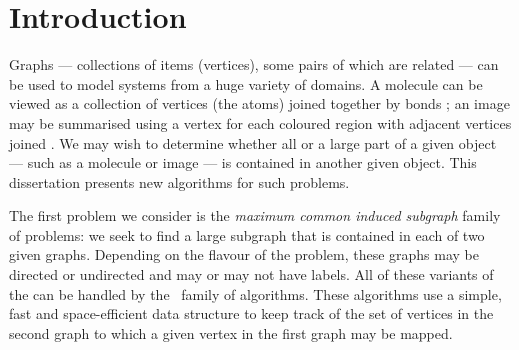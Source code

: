 \chapter{Introduction}
\label{c:intro}

\newcommand{\FourQueens}[2] {
  \begin{tikzpicture}[scale=0.6, every node/.style={black,scale=0.9}]
    \newcommand*{\xMin}{0}%
    \newcommand*{\xMax}{3}%
    \newcommand*{\yMin}{0}%
    \newcommand*{\yMax}{3}%
    \foreach \i / \label in {0/a,1/b,2/c,3/d} {
        \draw [] node at (\i+.5,\yMin-.3) {$\label$};
    }
    \foreach \i / \label in {0/1,1/2,2/3,3/4} {
        \draw [] node at (\xMin-.3,\i+.5) {$\label$};
    }

    \foreach \y in {0,2}{
        \foreach \x in {0,2}{
            \fill[black!8] (\x,\y) rectangle (1+\x,1+\y) rectangle (2+\x,2+\y);}}
    \draw [step=1.0] (0,0) grid (4,4);
    \foreach \x/\y/\m in {#2}
        \draw [] node at (\x,\y) {\m};
    \node[draw,circle,inner sep=1mm] at (-1.4,3.5) {#1};
  \end{tikzpicture}
}

\newcommand{\MCSDomains}[2] {
  \begin{tikzpicture}[scale=0.6, every node/.style={black,scale=0.9}]
    \newcommand*{\xMin}{0}%
    \newcommand*{\xMax}{5}%
    \newcommand*{\yMin}{0}%
    \newcommand*{\yMax}{4}%
    \foreach \i / \label in {0/a,1/b,2/c,3/d,4/e,5/f} {
        \draw [] node at (\i+.5,\yMax+1.4) {$\label$};
    }
    \foreach \i / \label in {4/1,3/2,2/3,1/4,0/5} {
        \draw [] node at (\xMin-.3,\i+.5) {$\label$};
    }

    \draw [step=1.0] (0,0) grid (6,5);
    \foreach \x/\y/\m in {#2}
        \draw [] node at (\x,\y) {\m};
    \node[draw,circle,inner sep=1mm] at (-1.4,3.5) {#1};
  \end{tikzpicture}
}

Graphs --- collections of items (vertices), some pairs of which
are related --- can be used to model
systems from a huge variety of domains.  A molecule can be viewed as a collection
of vertices (the atoms) joined together by bonds
\citep{sussenguth1965graph}; 
an image may be summarised using a vertex for each coloured region
with adjacent vertices joined \citep{DBLP:conf/icip/OlatunbosunDE96}.
We may wish to determine whether all or a large
part of a given object --- such as a molecule or image --- is contained
in another given object.  This dissertation presents new algorithms
for such problems.

The first problem we consider is the \emph{maximum common induced subgraph}
family of problems: we seek to find a large subgraph that is
contained in each of two given graphs.
Depending on the flavour of the problem, these
graphs may be directed or undirected and may or may not have labels.
All of these variants of the can be handled by the \McSplit\ family of algorithms.
These algorithms use a simple, fast and space-efficient data structure to keep
track of the set of vertices in the second graph to which a given vertex
in the first graph may be mapped.

